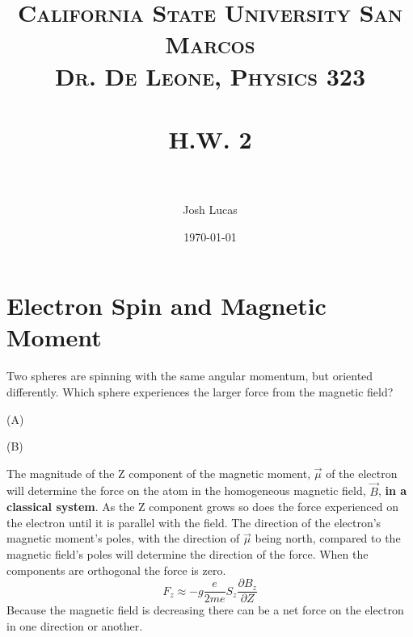 \documentclass[paper=a4, fontsize=11pt]{scrartcl} %
\title{	
\normalfont \normalsize 
\textsc{California State University San Marcos \\ Dr. De Leone, Physics 323} \\ [25pt] %
\horrule{0.5pt} \\[0.4cm] %
\huge H.W. 2\\ %
\horrule{2pt} \\[0.5cm] %
}
\author{Josh Lucas} %
\date{\normalsize\today} %
\numberwithin{equation}{section} %
\numberwithin{figure}{section} %
\numberwithin{table}{section} %
\begin{document}
\maketitle %


\section{Electron Spin and Magnetic Moment}
Two spheres are spinning with the same angular momentum, but oriented differently. Which sphere experiences the larger force from the magnetic field? 


(A)
\hspace{45mm}
(B)

The magnitude of the Z component of the magnetic moment, $\vec{\mu}$ of the electron will determine the force on the atom in the homogeneous magnetic field, $\vec{B}$, \textbf{in a classical system}. As the Z component grows so does the force experienced on the electron until it is parallel with the field. The direction of the electron's magnetic moment's poles, with the direction of $\vec{\mu}$ being north, compared to the magnetic field's poles will determine the direction of the force. When the components are orthogonal the force is zero. 
\begin{equation*}
F_z \approx -g\frac{e}{2me}S_z\frac{\partial B_z}{\partial Z}
\end{equation*}
Because the magnetic field is decreasing there can be a net force on the electron in one direction or another. 
\end{document}
